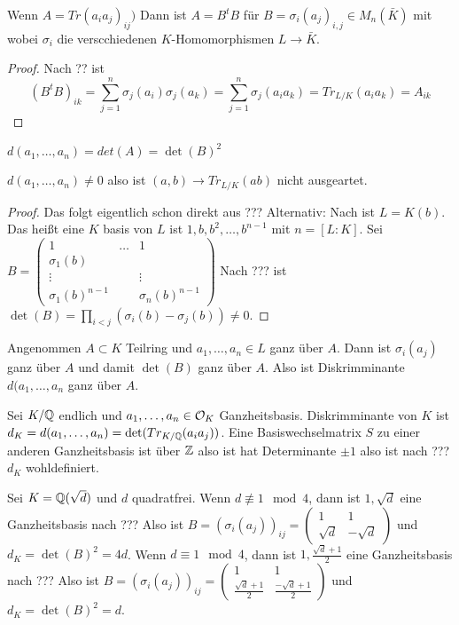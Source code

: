 \begin{Lemma}
    Wenn \(A=Tr(a_ia_j)_{ij})\) Dann ist \(A=B^tB\) für \(B=\sigma_i(a_j)_{i,j}\in M_n(\bar K)\) mit
    wobei \(\sigma_i\) die verscchiedenen \(K\)-Homomorphismen \(L\to \bar K\).
\end{Lemma}
\begin{proof}
    Nach ?? ist
    \[(B^tB)_{ik}=\sum_{j=1}^n\sigma_j(a_i)\sigma_j(a_k)=\sum_{j=1}^n\sigma_j(a_ia_k)=Tr_{L/K}(a_ia_k)=A_{ik}\]
\end{proof}
\begin{Kor}
    \(d(a_1,\dots,a_n)=det(A)=\det(B)^2\)
\end{Kor}
\begin{Satz}
\(d(a_1,\dots,a_n)\neq 0\) also ist \((a,b)\to Tr_{L/K}(ab)\) nicht ausgeartet.
\end{Satz}
\begin{proof}
    Das folgt eigentlich schon direkt aus ???
    Alternativ:
    Nach  ist \(L=K(b)\).
    Das heißt eine \(K\) basis von \(L\) ist \(1,b,b^2,\dots,b^{n-1}\) mit \(n=[L:K]\).
    Sei \(B=\begin{pmatrix}
1 & \dots & 1 \\
\sigma_1(b) &  &  \\
\vdots &  & \vdots \\
\sigma_1(b)^{n-1} &  & \sigma_n(b)^{n-1} 
\end{pmatrix} \) 
Nach ??? ist \(\det(B)=\prod_{i<j}(\sigma_i(b)-\sigma_j(b))\neq 0\).
\end{proof}
\begin{Bem}
    Angenommen \(A\subset K\) Teilring und \(a_1,\dots,a_n\in L\) ganz über \(A\).
    Dann ist \(\sigma_i(a_j)\) ganz über \(A\) und damit \(\det(B)\) ganz über \(A\).
    Also ist Diskrimminante \(d(a_1,\dots,a_n\) ganz über \(A\).
\end{Bem}
\begin{Def}
    Sei \(K/\mathbb{Q}\) endlich und \(a_1,\dots,a_n\in\mathcal{O}_K\) Ganzheitsbasis.
    Diskrimminante von \(K\) ist 
    \(d_K=d(a_1,\dots,a_n)=\det(Tr_{K/\mathbb{Q}}(a_ia_j))\).
    Eine Basiswechselmatrix \(S\) zu einer anderen Ganzheitsbasis ist über \(\mathbb{Z}\) 
    also ist hat Determinante \(\pm 1\) also ist nach ??? \(d_K\) wohldefiniert.
\end{Def}
\begin{Bsp}
    Sei \(K=\mathbb{Q}(\sqrt{d})\) und \(d\) quadratfrei.
    Wenn \(d\not\equiv 1 \mod 4\), dann ist \(1,\sqrt{d}\) eine Ganzheitsbasis nach ???
    Also ist \(B=(\sigma_i(a_j))_{ij}=\begin{pmatrix}
        1 & 1 \\
        \sqrt{d} & -\sqrt{d}
    \end{pmatrix}\) 
    und \(d_K=\det(B)^2=4d\).
    Wenn \(d\equiv 1 \mod 4\), dann ist \(1,\frac{\sqrt{d}+1}{2}\) eine Ganzheitsbasis nach ???
    Also ist \(B=(\sigma_i(a_j))_{ij}=\begin{pmatrix}
        1 & 1 \\
        \frac{\sqrt{d}+1}{2} & \frac{-\sqrt{d}+1}{2}
    \end{pmatrix}\) 
    und \(d_K=\det(B)^2=d\).
    
\end{Bsp}
